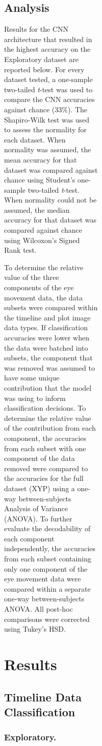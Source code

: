 \documentclass[
  english,
  man, donotrepeattitle,floatsintext]{apa6}
\begin{document}
\begin{figure}
\begin{figure}
\begin{figure}
\begin{figure}
\subsection{Analysis}

Results for the CNN architecture that resulted in the highest accuracy on the Exploratory dataset are reported below. For every dataset tested, a one-sample two-tailed \emph{t}-test was used to compare the CNN accuracies against chance (33\%). The Shapiro-Wilk test was used to assess the normality for each dataset. When normality was assumed, the mean accuracy for that dataset was compared against chance using Student's one-sample two-tailed \emph{t}-test. When normality could not be assumed, the median accuracy for that dataset was compared against chance using Wilcoxon's Signed Rank test.

To determine the relative value of the three components of the eye movement data, the data subsets were compared within the timeline and plot image data types. If classification accuracies were lower when the data were batched into subsets, the component that was removed was assumed to have some unique contribution that the model was using to inform classification decisions. To determine the relative value of the contribution from each component, the accuracies from each subset with one component of the data removed were compared to the accuracies for the full dataset (XYP) using a one-way between-subjects Analysis of Variance (ANOVA). To further evaluate the decodability of each component independently, the accuracies from each subset containing only one component of the eye movement data were compared within a separate one-way between-subjects ANOVA. All post-hoc comparisons were corrected using Tukey's HSD.

\section{Results}
\subsection{Timeline Data Classification}
\subsubsection{Exploratory.}


\end{figure}
\end{figure}
\end{figure}
\end{figure}
\end{document}

